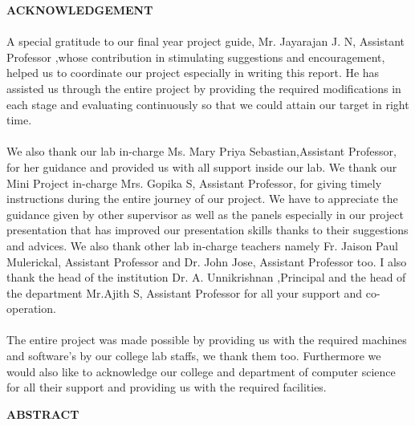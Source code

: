 \documentclass[a4paper]{report}
\begin{document}
\newpage
\begin{center}
\fontsize{17.28pt}{19.2pt}
\textbf{ACKNOWLEDGEMENT}\\[1.0cm]
\end{center}
\setcounter{page}{2}
\vspace{1.0cm}
\paragraph{}
\large\textnormal{A special gratitude to our final year project guide, Mr. Jayarajan J. N, Assistant Professor ,whose contribution in stimulating suggestions and encouragement, helped us to coordinate our project especially in writing this report. He has assisted us through the entire project by providing the required modifications in each stage and evaluating continuously so that we could attain our target in right time.}

\paragraph{}
\large\textnormal{ We also thank our lab in-charge Ms. Mary Priya Sebastian,Assistant Professor, for her guidance and provided us with all support inside our lab. We thank our Mini Project in-charge Mrs. Gopika S, Assistant Professor, for giving timely instructions during the entire journey of our project. We have to appreciate the guidance given by other supervisor as well as the panels especially in our project presentation that has improved our presentation skills thanks to their suggestions and advices. We also thank other lab in-charge teachers namely Fr. Jaison Paul Mulerickal, Assistant Professor and Dr. John Jose, Assistant Professor too. I also thank the head of the institution Dr. A. Unnikrishnan ,Principal and the head of the department Mr.Ajith S, Assistant Professor for all your support and co-operation.}

\paragraph{}
\large\textnormal{The entire project was made possible by providing us with the required machines and software’s by our college lab staffs, we thank them too. Furthermore we would also like to acknowledge our college and department of computer science for all their support and providing us with the required facilities.}

\newpage
\begin{center}
\fontsize{17.28pt}{19.2pt}
\textbf{ABSTRACT}\\[1.0cm]
\end{center}
\setcounter{page}{3}
\vspace{1.0cm}
\end{document}
